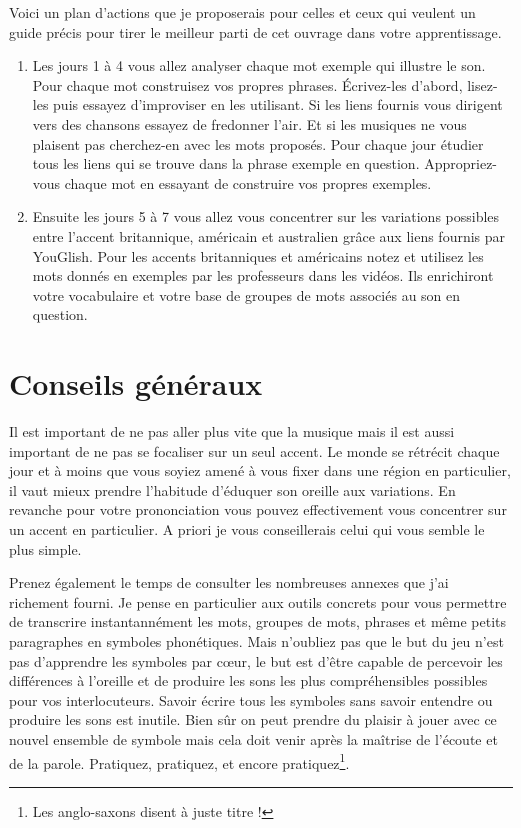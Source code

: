 Voici un plan d'actions que je proposerais pour celles et ceux qui
veulent un guide précis pour tirer le meilleur parti de cet ouvrage
dans votre apprentissage.

\begin{enumerate}
\item Les jours 1 à 4 vous allez analyser chaque mot exemple qui
  illustre le son. Pour chaque mot construisez vos propres
  phrases. \'Ecrivez-les d'abord, lisez-les puis essayez d'improviser
  en les utilisant. Si les liens fournis vous dirigent vers des
  chansons essayez de fredonner l'air. Et si les musiques ne vous
  plaisent pas cherchez-en avec les mots proposés. Pour chaque jour
  étudier tous les liens qui se trouve dans la phrase exemple en
  question. Appropriez-vous chaque mot en essayant de construire vos
  propres exemples.
\item  Ensuite les jours 5 à 7 vous allez vous concentrer sur les variations
 possibles entre l'accent britannique, américain et australien grâce
 aux liens fournis par YouGlish. Pour les accents britanniques et
 américains notez et utilisez les mots donnés en exemples par les
 professeurs dans les vidéos. Ils enrichiront votre vocabulaire et
 votre base de groupes de mots associés au son en question.
\end{enumerate}

\section{Conseils généraux}\label{sec:gen}

Il est important de ne pas aller plus vite que la musique mais il est
aussi important de ne pas se focaliser sur un seul accent. Le monde
se rétrécit chaque jour et à moins que vous soyiez amené à vous fixer
dans une région en particulier, il vaut mieux prendre l'habitude
d'éduquer son oreille aux variations. En revanche pour votre
prononciation vous pouvez effectivement vous concentrer sur un accent
en particulier. A priori je vous conseillerais celui qui vous semble
le plus simple.  

Prenez également le temps de consulter les nombreuses annexes que j'ai
richement fourni. Je pense en particulier aux outils concrets pour
vous permettre de transcrire instantannément les mots, groupes de
mots, phrases et même petits paragraphes en symboles phonétiques. Mais
n'oubliez pas que le but du jeu n'est pas d'apprendre les symboles par
c{\oe}ur, le but est d'être capable de percevoir les différences à
l'oreille et de produire les sons les plus compréhensibles possibles
pour vos interlocuteurs. Savoir écrire tous les symboles sans savoir
entendre ou produire les sons est inutile. Bien sûr on peut prendre du
plaisir à jouer avec ce nouvel ensemble de symbole mais cela doit
venir après la maîtrise de l'écoute et de la parole. Pratiquez,
pratiquez, et encore pratiquez\footnote{Les anglo-saxons disent
   à juste titre !}. 

